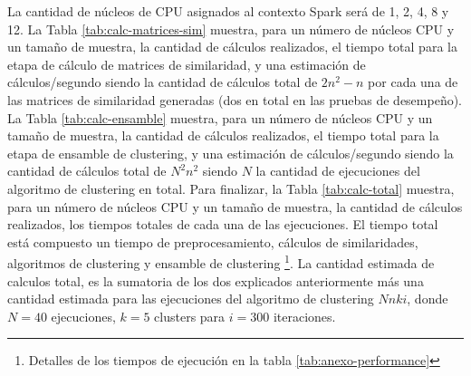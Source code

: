 \bigskip La cantidad de núcleos de CPU asignados al contexto Spark será de 1, 2, 4, 8 y 12. La Tabla \ref{tab:calc-matrices-sim} muestra, para un número de núcleos CPU y un tamaño de muestra, la cantidad de cálculos realizados, el tiempo total para la etapa de cálculo de matrices de similaridad, y una estimación de cálculos/segundo siendo la cantidad de cálculos total de \(2n^2-n\) por cada una de las matrices de similaridad generadas (dos en total en las pruebas de desempeño). La Tabla \ref{tab:calc-ensamble} muestra, para un número de núcleos CPU y un tamaño de muestra, la cantidad de cálculos realizados, el tiempo total para la etapa de ensamble de clustering, y una estimación de cálculos/segundo siendo la cantidad de cálculos total de \(N^2n^2\) siendo \(N\) la cantidad de ejecuciones del algoritmo de clustering en total. Para finalizar, la Tabla \ref{tab:calc-total}  muestra, para un número de núcleos CPU y un tamaño de muestra, la cantidad de cálculos realizados, los tiempos totales de cada una de las ejecuciones. El tiempo total está compuesto un tiempo de preprocesamiento, cálculos de similaridades, algoritmos de clustering y ensamble de clustering \footnote{Detalles de los tiempos de ejecución en la tabla \ref{tab:anexo-performance}}. La cantidad estimada de calculos total, es la sumatoria de los dos explicados anteriormente más una cantidad estimada para las ejecuciones del algoritmo de clustering \(Nnki\), donde \(N=40\) ejecuciones, \(k=5\) clusters para \(i=300\) iteraciones.

